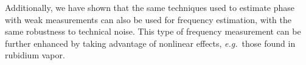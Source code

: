 Additionally, we have shown that the same techniques used to estimate phase with weak measurements can also be used for frequency estimation, with the same robustness to technical noise.  This type of frequency measurement can be further enhanced by taking advantage of nonlinear effects, \emph{e.g.}~those found in rubidium vapor.

